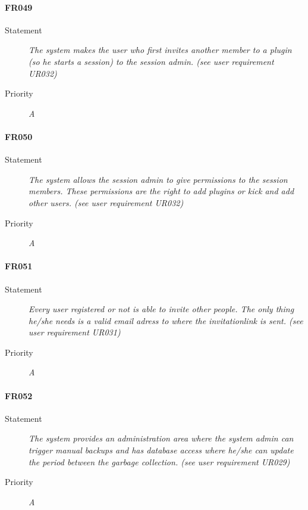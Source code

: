 \paragraph{FR049}
\begin{description}
  \item[Statement]
    \textit{The system makes the user who first invites another member to a plugin (so he starts a session) to the session admin. (see user requirement UR032)}
  \item[Priority]
    \textit{A}
\end{description}

\paragraph{FR050}
\begin{description}
  \item[Statement]
    \textit{The system allows the session admin to give permissions to the session members. These permissions are the right to add plugins or kick and add other users. (see user requirement UR032)}
  \item[Priority]
    \textit{A}
\end{description}

\paragraph{FR051}
\begin{description}
  \item[Statement]
    \textit{Every user registered or not is able to invite other people. The only thing he/she needs is a valid email adress to where the invitationlink is sent. (see user requirement UR031)}
  \item[Priority]
    \textit{A}
\end{description}

\paragraph{FR052}
\begin{description}
  \item[Statement]
    \textit{The system provides an administration area where the system admin can trigger manual backups and has database access where he/she can update the period between the garbage collection. (see user requirement UR029)}
  \item[Priority]
    \textit{A}
\end{description}
